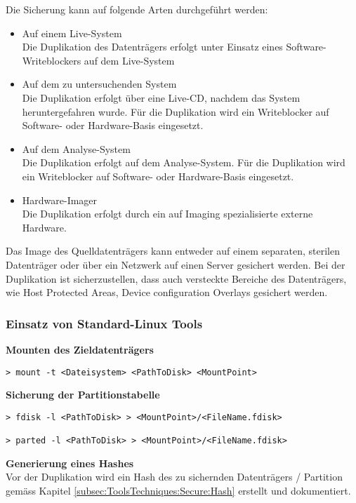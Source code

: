 Die Sicherung kann auf folgende Arten durchgeführt werden:
\begin{itemize}
\item Auf einem Live-System\\
Die Duplikation des Datenträgers erfolgt unter Einsatz eines Software-Writeblockers auf dem Live-System
\item Auf dem zu untersuchenden System\\
Die Duplikation erfolgt über eine Live-CD, nachdem das System heruntergefahren wurde. Für die Duplikation wird ein Writeblocker auf Software- oder Hardware-Basis eingesetzt.
\item Auf dem Analyse-System\\
Die Duplikation erfolgt auf dem Analyse-System. Für die Duplikation wird ein Writeblocker auf Software- oder Hardware-Basis eingesetzt.
\item Hardware-Imager\\
Die Duplikation erfolgt durch ein auf Imaging spezialisierte externe Hardware.
\end{itemize}

Das Image des Quelldatenträgers kann entweder auf einem separaten, sterilen Datenträger oder über ein Netzwerk auf einen Server gesichert werden. Bei der Duplikation ist sicherzustellen, dass auch versteckte Bereiche des Datenträgers, wie Host Protected Areas, Device configuration Overlays gesichert werden.

\subsubsection{Einsatz von Standard-Linux Tools}

\textbf{Mounten des Zieldatenträgers}
\begin{lstlisting}
> mount -t <Dateisystem> <PathToDisk> <MountPoint>
\end{lstlisting}

\textbf{Sicherung der Partitionstabelle}
\begin{lstlisting}
> fdisk -l <PathToDisk> > <MountPoint>/<FileName.fdisk>

> parted -l <PathToDisk> > <MountPoint>/<FileName.fdisk>
\end{lstlisting}

\textbf{Generierung eines Hashes}\\
Vor der Duplikation wird ein Hash des zu sichernden Datenträgers / Partition gemäss Kapitel \ref{subsec:ToolsTechniques:Secure:Hash}  erstellt und dokumentiert.

